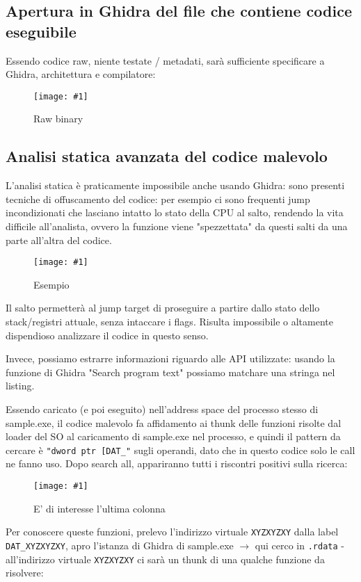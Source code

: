 \documentclass[
    a4paper, %
    11pt %
]{article}
\newcommand{\pic}[4]{\begin{figure}[H]
            \centering
            \texttt{[image: \#1]}
            \caption{#2}
            \label{fig:#1}
            \end{figure}}
\begin{document}
            \subsection*{Apertura in Ghidra del file che contiene codice eseguibile}

            Essendo codice raw, niente testate / metadati, sarà sufficiente specificare a Ghidra,
            architettura e compilatore:

            \pic{ghidra_raw_open}{Raw binary}{12cm}{6cm}

            \subsection{Analisi statica avanzata del codice malevolo}
            L'analisi statica è praticamente impossibile anche usando Ghidra: sono presenti tecniche di
            offuscamento del codice: per esempio ci sono frequenti jump incondizionati che lasciano intatto
            lo stato della CPU al salto, rendendo la vita difficile all'analista, ovvero la funzione viene
            "spezzettata" da questi salti da una parte all'altra del codice.

            \pic{ghidra_raw_imposs}{Esempio}{8cm}{12cm}

            Il salto permetterà al jump target di proseguire a partire dallo stato dello stack/registri
            attuale, senza intaccare i flags. Risulta impossibile o altamente dispendioso analizzare
            il codice in questo senso.

            Invece, possiamo estrarre informazioni riguardo alle API utilizzate: usando la funzione di Ghidra "Search program text" possiamo matchare una stringa nel listing.
            
            Essendo caricato (e poi eseguito) nell'address space del processo stesso di sample.exe, il codice malevolo fa affidamento ai thunk delle funzioni risolte dal loader del SO al
            caricamento di sample.exe nel processo, e quindi il pattern da cercare è \texttt{"dword ptr [DAT\_"}
            sugli operandi, dato che in questo codice solo le call ne fanno uso.
            Dopo search all, appariranno tutti i riscontri positivi sulla ricerca:
            \pic{ghidra_raw_calls}{E' di interesse l'ultima colonna}{19cm}{10cm}

            Per conoscere queste funzioni, prelevo l'indirizzo virtuale \texttt{XYZXYZXY} dalla label 
            \texttt{DAT\_XYZXYZXY}, apro l'istanza di
            Ghidra di sample.exe $\rightarrow$ qui cerco in \texttt{.rdata} - all'indirizzo virtuale 
            \texttt{XYZXYZXY} ci sarà un thunk di una qualche funzione da risolvere:
\end{document}

